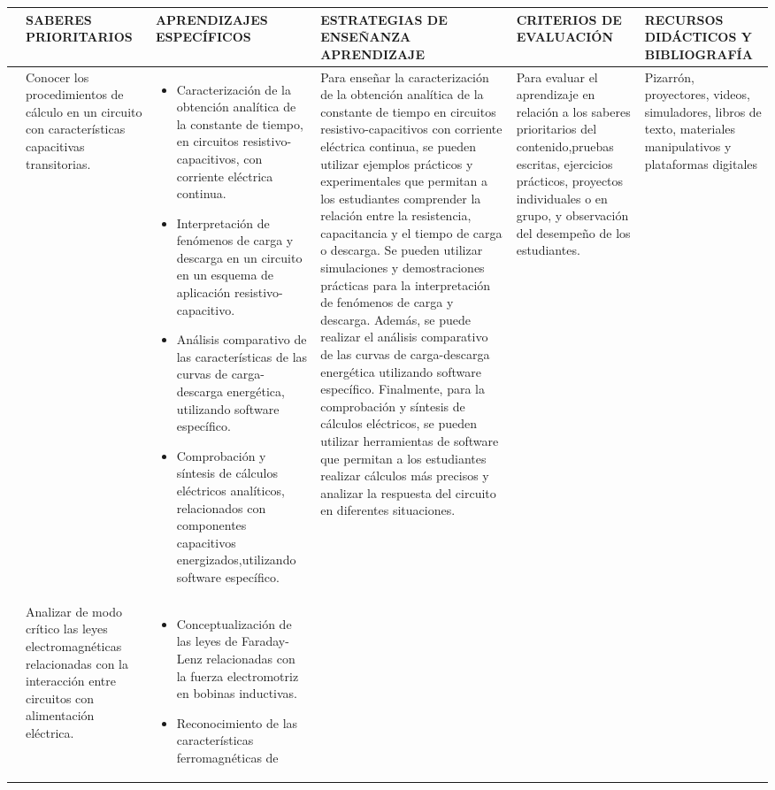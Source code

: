 \documentclass[a4paper,12pt]{article}
\newcommand{\vertical}[1]{\rotatebox[origin=r]{90}{#1}}
\newcommand{\evaluacion}{Para evaluar el aprendizaje en relación a los saberes prioritarios del contenido,pruebas escritas, ejercicios prácticos, proyectos individuales o en
grupo, y observación del desempeño de los estudiantes.}
\newcommand{\recursos}{Pizarrón, proyectores, videos, simuladores, libros de texto, materiales manipulativos y plataformas digitales}
\begin{document}
\begin{longtable}[h!]{|p{1cm}|p{3cm}|p{8cm}|p{6cm}|p{3.5cm}|p{3cm}|}
\hline
\vertical{EJE} & SABERES PRIORITARIOS & APRENDIZAJES ESPECÍFICOS & ESTRATEGIAS DE ENSEÑANZA APRENDIZAJE & CRITERIOS DE EVALUACIÓN & RECURSOS DIDÁCTICOS Y BIBLIOGRAFÍA \\
\endhead
\hline
\vertical{CIRCUITOS RESISTIVO- CAPACITIVOS} & Conocer los
procedimientos de cálculo
en un circuito con
características capacitivas
transitorias. & \begin{itemize}\item Caracterización de la obtención analítica de la constante
de tiempo, en circuitos resistivo-capacitivos, con corriente
eléctrica continua.\item Interpretación de fenómenos de carga y descarga en un
circuito en un esquema de aplicación resistivo-capacitivo.
\item Análisis comparativo de las características de las curvas
de carga-descarga energética, utilizando software
específico.
\item Comprobación y síntesis de cálculos eléctricos analíticos,
relacionados con componentes capacitivos energizados,utilizando software específico. \end{itemize} & Para enseñar la caracterización de la obtención analítica de la constante de tiempo en circuitos resistivo-capacitivos con corriente eléctrica continua, se pueden utilizar ejemplos prácticos y experimentales que permitan a los estudiantes comprender la relación entre la resistencia, capacitancia y el tiempo de carga o descarga. Se pueden utilizar simulaciones y demostraciones prácticas para la interpretación de fenómenos de carga y descarga. Además, se puede realizar el análisis comparativo de las curvas de carga-descarga energética utilizando software específico. Finalmente, para la comprobación y síntesis de cálculos eléctricos, se pueden utilizar herramientas de software que permitan a los estudiantes realizar cálculos más precisos y analizar la respuesta del circuito en diferentes situaciones. & \evaluacion & \recursos \\
\hline
\vertical{INDUCCIÓN ELECTROMAGNÉTICA} & Analizar de modo crítico las
leyes electromagnéticas
relacionadas con la interacción entre circuitos
con alimentación eléctrica. & \begin{itemize}
    \item Conceptualización de las leyes de Faraday-Lenz
relacionadas con la fuerza electromotriz en bobinas inductivas.
\item Reconocimiento de las características ferromagnéticas de

\end{itemize}
\end{longtable}
\end{document}
